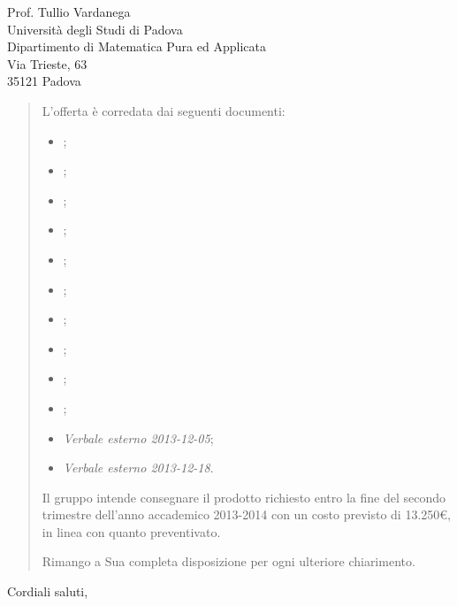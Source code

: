 \documentclass{letter}
\begin{document}
\begin{letter}{
	Prof. Tullio Vardanega \\
	Università degli Studi di Padova \\
	Dipartimento di Matematica Pura ed Applicata \\
	Via Trieste, 63 \\
	35121 Padova
}
\begin{quotation}
	L'offerta è corredata dai seguenti documenti:

	\begin{itemize}

		\item \AnalisiDeiRequisiti{};
		\item \DefinizioneDiProdotto{};
		\item \Glossario{};
		\item \ManualeAdmin{};
		\item \ManualeSviluppatore{};
		\item \ManualeUtente{};
		\item \NormeDiProgetto{};
		\item \PianoDiProgetto{};
		\item \PianoDiQualifica{};
		\item \SpecificaTecnica{};
		\item \emph{Verbale esterno 2013-12-05};
		\item \emph{Verbale esterno 2013-12-18}.

	\end{itemize}

	Il gruppo \GroupName{} intende consegnare il prodotto richiesto entro la fine del secondo trimestre dell'anno accademico 2013-2014 con un costo previsto di 13.250\euro, in linea con quanto preventivato.

	Rimango a Sua completa disposizione per ogni ulteriore chiarimento.

\end{quotation}

\closing{Cordiali saluti,}


\end{letter}
\end{document}

